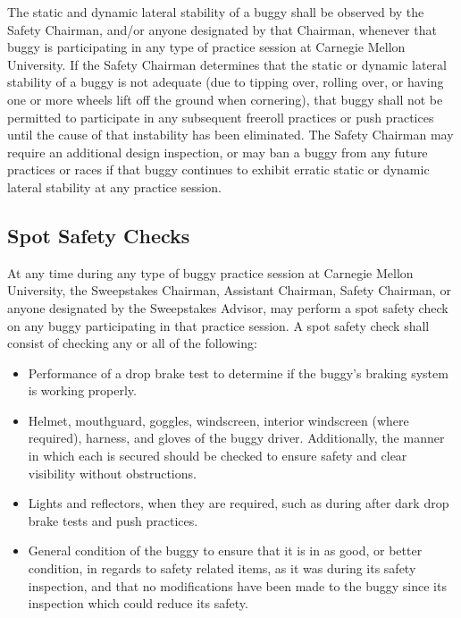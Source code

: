 \begin{itemize}
		The static and dynamic lateral stability of a buggy shall be observed by the
		Safety Chairman, and/or anyone designated by that Chairman, whenever that buggy
		is participating in any type of practice session at Carnegie Mellon University.
		If the Safety Chairman determines that the static or dynamic lateral stability
		of a buggy is not adequate (due to tipping over, rolling over, or having one or
		more wheels lift off the ground when cornering), that buggy shall not be
		permitted to participate in any subsequent freeroll practices or push practices
		until the cause of that instability has been eliminated. The Safety Chairman
		may require an additional design inspection, or may ban a buggy from any future
		practices or races if that buggy continues to exhibit erratic static or dynamic
		lateral stability at any practice session.

	\end{itemize}

\subsection{Spot Safety Checks}

	At any time during any type of buggy practice session at Carnegie Mellon
	University, the Sweepstakes Chairman, Assistant Chairman, Safety Chairman, or
	anyone designated by the Sweepstakes Advisor, may perform a spot safety check
	on any buggy participating in that practice session. A spot safety check shall
	consist of checking any or all of the following:

	\begin{itemize}

		\item Performance of a drop brake test to determine if the buggy's braking
		system is working properly.

		\item Helmet, mouthguard, goggles, windscreen, interior windscreen (where required), 
		harness, and gloves of the buggy driver. Additionally, the manner in which each is 
		secured should be checked to ensure safety and clear visibility without 
		obstructions.

		\item Lights and reflectors, when they are required,
		such as during after dark drop brake tests and push practices.

		\item General condition of the buggy to ensure that it is in as
		good, or better condition, in regards to safety related items, as it was during
		its safety inspection, and that no modifications have been made to the buggy
		since its inspection which could reduce its safety.

	\end{itemize}

